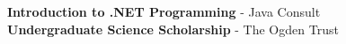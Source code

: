 \documentclass[9pt]{developercv} %
\begin{document}
\vspace{-10 pt}
    \vspace{-6pt}
    
    \hspace{26mm} \textbf{Introduction to .NET Programming} - Java Consult \\ 
    
    \hspace{26mm} \textbf{Undergraduate Science Scholarship} - The Ogden Trust



    

\
\end{document}

